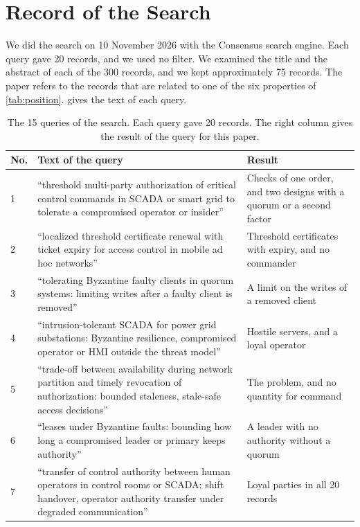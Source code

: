 \section{Record of the Search}
\label{app:search}

We did the search on 10 November 2026 with the Consensus search engine. Each query gave 20
records, and we used no filter. We examined the title and the abstract of each of the 300
records, and we kept approximately 75 records. The paper refers to the records that are
related to one of the six properties of \cref{tab:position}.  gives the
text of each query.

\begin{table}[t]
\caption{The 15 queries of the search. Each query gave 20 records. The right column gives
the result of the query for this paper.}
\label{tab:queries}
\centering
\footnotesize
\begin{tabularx}{\textwidth}{@{}l>{\raggedright\arraybackslash}p{}>{\raggedright\arraybackslash}X@{}}
\toprule
No. & Text of the query & Result \\
\midrule
1 & ``threshold multi-party authorization of critical control commands in SCADA or smart grid to tolerate a compromised operator or insider'' & Checks of one order, and two designs with a quorum or a second factor \\
2 & ``localized threshold certificate renewal with ticket expiry for access control in mobile ad hoc networks'' & Threshold certificates with expiry, and no commander \\
3 & ``tolerating Byzantine faulty clients in quorum systems: limiting writes after a faulty client is removed'' & A limit on the writes of a removed client \\
4 & ``intrusion-tolerant SCADA for power grid substations: Byzantine resilience, compromised operator or HMI outside the threat model'' & Hostile servers, and a loyal operator \\
5 & ``trade-off between availability during network partition and timely revocation of authorization: bounded staleness, stale-safe access decisions'' & The problem, and no quantity for command \\
6 & ``leases under Byzantine faults: bounding how long a compromised leader or primary keeps authority'' & A leader with no authority without a quorum \\
7 & ``transfer of control authority between human operators in control rooms or SCADA: shift handover, operator authority transfer under degraded communication'' & Loyal parties in all 20 records \\

\end{tabularx}
\end{table}
